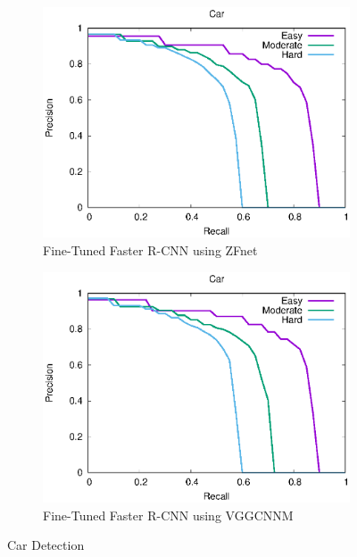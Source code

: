\begin{figure}[h!]
\begin{subfigure}[t]{.32\textwidth}
    \includegraphics[width=1.0\linewidth]{img/FRCNN_Dec_7_tiny/plot_valid_30/car_detection.eps}
    \caption{Fine-Tuned Faster R-CNN using ZFnet}
\end{subfigure}%
\begin{subfigure}[t]{.32\textwidth}
    \centering
    \includegraphics[width=1.0\linewidth]{img/FRCNN_Dec_7_mid/plot_valid_30/car_detection.eps}
    \caption{Fine-Tuned Faster R-CNN using VGG\textunderscore CNN\textunderscore M }
\end{subfigure}
\caption{Car Detection}
\end{figure}

